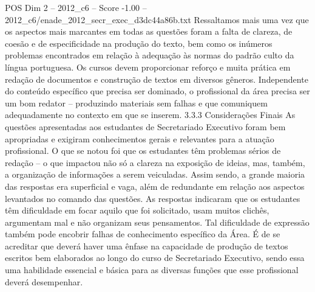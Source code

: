 \begin{textsample}{POS Dim 2 – 2012\_c6 – Score -1.00 – 2012\_c6/enade\_2012\_secr\_exec\_d3dc44a86b.txt}
Ressaltamos mais uma vez que os aspectos mais marcantes em todas as questões foram a falta de clareza, de coesão e de especificidade na produção do texto, bem como os inúmeros problemas encontrados em relação à adequação às normas do padrão culto da língua portuguesa.
Os cursos devem proporcionar reforço e muita prática em redação de documentos e construção de textos em diversos gêneros.
Independente do conteúdo específico que precisa ser dominado, o profissional da área precisa ser um bom redator – produzindo materiais sem falhas e que comuniquem adequadamente no contexto em que se inserem. 3.3.3 Considerações Finais As questões apresentadas aos estudantes de Secretariado Executivo foram bem apropriadas e exigiram conhecimentos gerais e relevantes para a atuação profissional.
O que se notou foi que os estudantes têm problemas sérios de redação – o que impactou não só a clareza na exposição de ideias, mas, também, a organização de informações a serem veiculadas.
Assim sendo, a grande maioria das respostas era superficial e vaga, além de redundante em relação aos aspectos levantados no comando das questões.
As respostas indicaram que os estudantes têm dificuldade em focar aquilo que foi solicitado, usam muitos clichês, argumentam mal e não organizam seus pensamentos.
Tal dificuldade de expressão também pode encobrir falhas de conhecimento específico da Área.
É de se acreditar que deverá haver uma ênfase na capacidade de produção de textos escritos bem elaborados ao longo do curso de Secretariado Executivo, sendo essa uma habilidade essencial e básica para as diversas funções que esse profissional deverá desempenhar.

\end{textsample}
